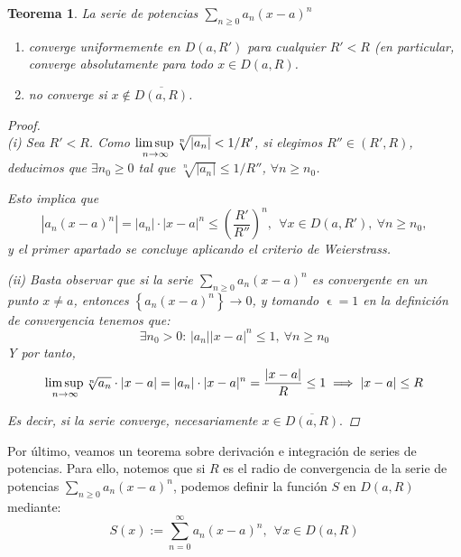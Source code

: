 \documentclass[11pt, a4paper]{article}
\let\epsilon\upvarepsilon
\theoremstyle{theorem-style}
\newtheorem{nth}{Teorema}[section]
\theoremstyle{definition-style}
\theoremstyle{remark-style}
\theoremstyle{example-style}
\newenvironment{nlist}
{\begin{enumerate}
\renewcommand\labelenumi{(\emph{\roman{enumi})}}}
{\end{enumerate}}
\begin{document}
\begin{nth}
La serie de potencias $\displaystyle\sum_{n\geq 0} a_n (x-a)^n$  
\begin{nlist}
\item converge uniformemente en $D(a,R')$ para cualquier $R'<R$ (en particular, converge absolutamente para todo $x\in D(a,R)$.
\item no converge si $x\not\in \overline{D(a,R)}$.
\end{nlist}

\begin{proof} \hfill \\
	\textit{(i)} Sea $R'<R$. Como $\underset{n\to\infty}{\mbox{lim\,sup\,}} \sqrt[n]{|a_n|} < 1/R'$, si elegimos $R''\in (R',R)$, deducimos que $\exists n_0\geq 0$ tal que $\sqrt[n]{|a_n|} \leq 1/R''$, $\forall n\geq n_0$.

Esto implica que
\[
\left| a_n (x-a)^n\right| = |a_n|\cdot|x-a|^n \leq \left(\frac{R'}{R''}\right)^n, \ \ \forall x\in D(a,R'), \ \forall n\geq n_0,
\]
y el primer apartado se concluye aplicando el criterio de Weierstrass.

\textit{(ii)} Basta observar que si la serie $\sum_{n\geq 0} a_n (x-a)^n$ es convergente en un punto $x\not= a$, entonces $\left\{ a_n (x-a)^n \right\} \to 0$, y tomando $\epsilon = 1$ en la definición de convergencia tenemos que:
\[
\exists n_0>0: \,  |a_n| |x-a|^n \leq 1, \ \forall n\geq n_0
\]
Y por tanto, $$\underset{n\to\infty}{\mbox{lim\,sup\,}} \sqrt[n]{a_n} \cdot |x-a| = |a_n| \cdot |x-a|^n =\frac{|x-a|}{R} \leq 1 \implies |x-a| \le R$$

Es decir, si la serie converge, necesariamente $x \in \overline{D(a,R)}.$
\end{proof}
\end{nth}

Por último, veamos un teorema sobre derivación e integración de series de potencias. Para ello, notemos que si $R$ es el radio de convergencia de la serie de potencias $\displaystyle\sum_{n\geq 0} a_n (x-a)^n$, podemos definir la función $S$ en $D(a,R)$ mediante: \[ 
S(x):= \sum_{n= 0}^\infty a_n (x-a)^n
, \ \ \forall x\in  D(a,R)
\] 
\end{document}
